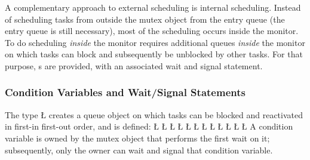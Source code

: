 \documentclass[openright,twoside]{report}
\begin{document}
A complementary approach to external scheduling is internal scheduling.
Instead of scheduling tasks from outside the mutex object from the entry queue (the entry queue is still necessary), most of the scheduling occurs inside the monitor.
To do scheduling \emph{inside} the monitor requires additional queues \emph{inside} the monitor on which tasks can block and subsequently be unblocked by other tasks.
For that purpose, s are provided, with an associated wait and signal statement.


\subsubsection{Condition Variables and Wait/Signal Statements}
\label{s:CondVarWaitSignal}

The type \LGinlinetrue\LGbegin\lgrinde\L{}\endlgrinde\LGend{} creates a queue object on which tasks can be blocked and reactivated in first-in first-out order, and is defined:
\LGinlinefalse\LGbegin\lgrinde
\L{}
\L{}
\L{\LB{}}
\CE{}\L{\LB{}}
\CE{}\L{\LB{}}
\CE{}\L{\LB{}}
\CE{}\L{\LB{}}
\L{\LB{}}
\L{\LB{}}
\L{\LB{}}
\L{\LB{\};}}
\L{}
\endlgrinde\LGend
{}%
%
%
%
%
%
A condition variable is owned by the mutex object that performs the first wait on it;
subsequently, only the owner can wait and signal that condition variable.
\end{document}
